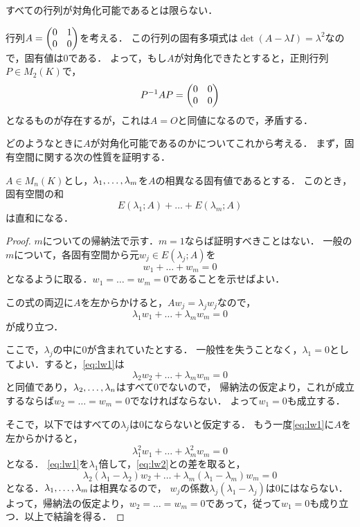 すべての行列が対角化可能であるとは限らない．
\begin{example}
    行列$A=\begin{pmatrix} 0 & 1 \\ 0 & 0 \end{pmatrix}$を考える．
    この行列の固有多項式は$\det(A-\lambda I) = \lambda^2$なので，固有値は0である．
    よって，もし$A$が対角化できたとすると，正則行列$P \in M_2(K)$で，
    \[
        P^{-1}AP = \begin{pmatrix} 0 & 0 \\ 0 & 0 \end{pmatrix}    
    \]
    となるものが存在するが，これは$A=O$と同値になるので，矛盾する．
\end{example}
どのようなときに$A$が対角化可能であるのかについてこれから考える．
まず，固有空間に関する次の性質を証明する．
\begin{prop}\label{prop:direct_sum_eigenspace}
    $A \in M_n(K)$とし，$\lambda_{1},\dots,\lambda_{m}$を$A$の相異なる固有値であるとする．
    このとき，固有空間の和
    \[
        E(\lambda_1;A) + \dots + E(\lambda_m;A)    
    \]
    は直和になる．
\end{prop}
\begin{proof}
    $m$についての帰納法で示す．$m=1$ならば証明すべきことはない．
    一般の$m$について，各固有空間から元$w_j \in E(\lambda_j;A)$を
    \[
        w_1 + \dots + w_m = 0    
    \]
    となるように取る．$w_1=\dots=w_m=0$であることを示せばよい．

    この式の両辺に$A$を左からかけると，$Aw_j = \lambda_j w_j$なので，
    \begin{equation}\label{eq:lw1}
        \lambda_1 w_1 + \dots + \lambda_m w_m = 0
    \end{equation}
    が成り立つ．

    ここで，$\lambda_j$の中に0が含まれていたとする．
    一般性を失うことなく，$\lambda_1 = 0$としてよい．すると，\eqref{eq:lw1}は
    \[
        \lambda_2 w_2 + \dots + \lambda_m w_m = 0    
    \]
    と同値であり，$\lambda_{2},\dots,\lambda_{n}$はすべて0でないので，
    帰納法の仮定より，これが成立するならば$w_2=\dots=w_m=0$でなければならない．
    よって$w_1 =0$も成立する．

    そこで，以下ではすべての$\lambda_j$は0にならないと仮定する．
    もう一度\eqref{eq:lw1}に$A$を左からかけると，
    \begin{equation}\label{eq:lw2}
        \lambda_1^2 w_1 + \dots + \lambda_m^2 w_m = 0
    \end{equation}
    となる．
    \eqref{eq:lw1}を$\lambda_1$倍して，\eqref{eq:lw2}との差を取ると，
    \[
        \lambda_2 (\lambda_1 - \lambda_2) w_2 + \dots + \lambda_m (\lambda_1 - \lambda_m) w_m = 0    
    \]
    となる．$\lambda_{1},\dots,\lambda_{m}$は相異なるので，
    $w_j$の係数$\lambda_j (\lambda_1 - \lambda_j)$は0にはならない．
    よって，帰納法の仮定より，$w_2 = \dots = w_m = 0$であって，従って$w_1 = 0$も成り立つ．以上で結論を得る．
\end{proof}
